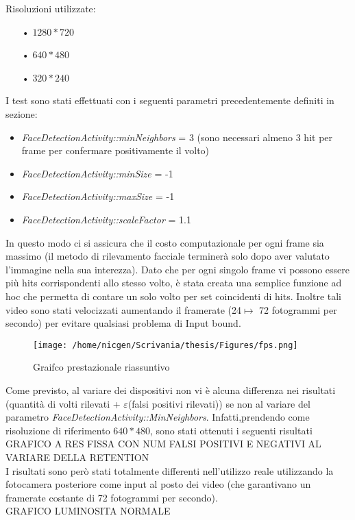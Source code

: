 Risoluzioni utilizzate:

\begin{itemize}
\item[•] $1280\ast720$ 
\item[•] $640\ast480$ 
\item[•] $320\ast240$ 
\end{itemize}

I test sono stati effettuati con i seguenti parametri precedentemente definiti in sezione:
\begin{itemize}
\item \textit{FaceDetectionActivity::minNeighbors} = 3 (sono necessari almeno 3 hit per frame per confermare positivamente il volto)
\item \textit{FaceDetectionActivity::minSize} = -1  
\item \textit{FaceDetectionActivity::maxSize} = -1
\item \textit{FaceDetectionActivity::scaleFactor} = 1.1 
\end{itemize}

In questo modo ci si assicura che il costo computazionale per ogni frame sia massimo (il metodo di rilevamento facciale terminerà solo dopo aver valutato l'immagine nella sua interezza). 
Dato che per ogni singolo frame vi possono essere più hits corrispondenti allo stesso volto, è stata creata una semplice funzione ad hoc che permetta di contare un solo volto per set coincidenti di hits. Inoltre tali video sono stati velocizzati aumentando il framerate (24$\longmapsto$ 72 fotogrammi per secondo) per evitare qualsiasi problema di Input bound.


\begin{figure}[h]\centering  
\texttt{[image: /home/nicgen/Scrivania/thesis/Figures/fps.png]}
\caption[Grafico prestazionale riassuntivo]{Graifco prestazionale riassuntivo}
\label{pic-a}
\end{figure}

Come previsto, al variare dei dispositivi non vi è alcuna differenza nei risultati (quantità di volti rilevati + $\varepsilon$(falsi positivi rilevati)) se non al variare del parametro \textit{FaceDetectionActivity::MinNeighbors}. Infatti,prendendo come risoluzione di riferimento $640 \ast 480$, sono stati ottenuti i seguenti risultati
\\
GRAFICO A RES FISSA CON NUM FALSI POSITIVI E NEGATIVI AL VARIARE DELLA RETENTION 
\\
I risultati sono però stati totalmente differenti nell'utilizzo reale utilizzando la fotocamera posteriore come input al posto dei video (che garantivano un framerate costante di 72 fotogrammi per secondo). 
\\
GRAFICO LUMINOSITA NORMALE

